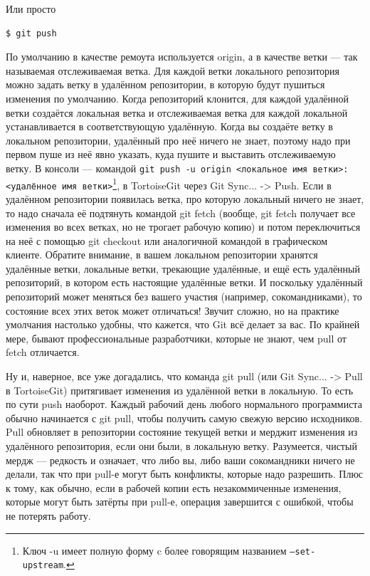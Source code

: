\documentclass{../text-style}
\begin{document}
Или просто

\begin{verbatim}
$ git push
\end{verbatim}

По умолчанию в качестве ремоута используется origin, а в качестве ветки --- так называемая отслеживаемая ветка. Для каждой ветки локального репозитория можно задать ветку в удалённом репозитории, в которую будут пушиться изменения по умолчанию. Когда репозиторий клонится, для каждой удалённой ветки создаётся локальная ветка и отслеживаемая ветка для каждой локальной устанавливается в соответствующую удалённую. Когда вы создаёте ветку в локальном репозитории, удалённый про неё ничего не знает, поэтому надо при первом пуше из неё явно указать, куда пушите и выставить отслеживаемую ветку. В консоли --- командой \verb|git push -u origin <локальное имя ветки>:<удалённое имя ветки>|\footnote{Ключ -u имеет полную форму c более говорящим названием \texttt{--set-upstream}.}, в TortoiseGit через Git Sync... -> Push. Если в удалённом репозитории появилась ветка, про которую локальный ничего не знает, то надо сначала её подтянуть командой git fetch (вообще, git fetch получает все изменения во всех ветках, но не трогает рабочую копию) и потом переключиться на неё с помощью git checkout или аналогичной командой в графическом клиенте. Обратите внимание, в вашем локальном репозитории хранятся удалённые ветки, локальные ветки, трекающие удалённые, и ещё есть удалённый репозиторий, в котором есть настоящие удалённые ветки. И поскольку удалённый репозиторий может меняться без вашего участия (например, сокомандниками), то состояние всех этих веток может отличаться! Звучит сложно, но на практике умолчания настолько удобны, что кажется, что Git всё делает за вас. По крайней мере, бывают профессиональные разработчики, которые не знают, чем pull от fetch отличается.

Ну и, наверное, все уже догадались, что команда git pull (или Git Sync... -> Pull в TortoiseGit) притягивает изменения из удалённой ветки в локальную. То есть по сути push наоборот. Каждый рабочий день любого нормального программиста обычно начинается с git pull, чтобы получить самую свежую версию исходников. Pull обновляет в репозитории состояние текущей ветки и мерджит изменения из удалённого репозитория, если они были, в локальную ветку. Разумеется, чистый мердж --- редкость и означает, что либо вы, либо ваши сокомандники ничего не делали, так что при pull-е могут быть конфликты, которые надо разрешить. Плюс к тому, как обычно, если в рабочей копии есть незакоммиченные изменения, которые могут быть затёрты при pull-е, операция завершится с ошибкой, чтобы не потерять работу.
\end{document}
